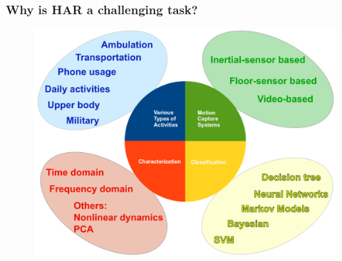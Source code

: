 \documentclass{beamer}
\begin{document}
% 
% 



\begin{frame}
	\frametitle{Why is HAR a challenging task?}
\vspace{-0.5cm}
\begin{figure}
 \includegraphics[scale=.3]{har01}
\vspace{-0.6cm}
\end{figure}
\end{frame}
\end{document}
